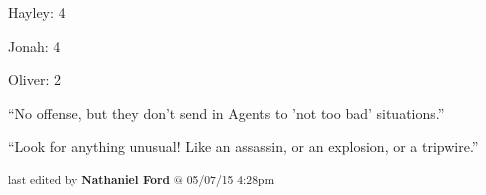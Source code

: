 
{\parskip=0pt
Hayley: 4

Jonah: 4

Oliver: 2
}


``No offense, but they don't send in Agents to 'not too bad' situations.''




``Look for anything unusual!  Like an assassin, or an explosion, or a tripwire.'' 



\vspace{\fill}

\begin{flushright}
\textsubscript{last edited by \textbf{Nathaniel Ford} @ 05/07/15 4:28pm}
\end{flushright}

